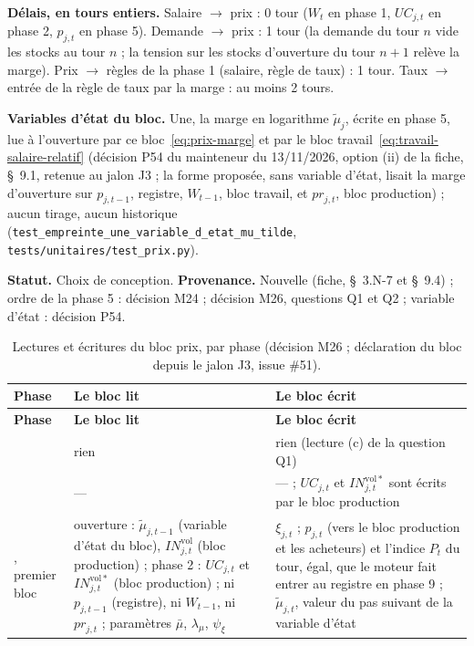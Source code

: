 \documentclass[11pt,a4paper]{article}
\begin{document}
\textbf{Délais, en tours entiers.} Salaire $\to$ prix : 0 tour ($W_t$ en phase 1, $\mathit{UC}_{j,t}$ en phase 2, $p_{j,t}$ en phase 5). Demande $\to$ prix : 1 tour (la demande du tour $n$ vide les stocks au tour $n$ ; la tension sur les stocks d'ouverture du tour $n + 1$ relève la marge). Prix $\to$ règles de la phase 1 (salaire, règle de taux) : 1 tour. Taux $\to$ entrée de la règle de taux par la marge : au moins 2 tours.

\textbf{Variables d'état du bloc.} Une, la marge en logarithme $\tilde\mu_{j}$, écrite en phase 5, lue à l'ouverture par ce bloc~\eqref{eq:prix-marge} et par le bloc travail~\eqref{eq:travail-salaire-relatif} (décision P54 du mainteneur du 13/11/2026, option (ii) de la fiche, \S~9.1, retenue au jalon J3 ; la forme proposée, sans variable d'état, lisait la marge d'ouverture sur $p_{j,t-1}$, registre, $W_{t-1}$, bloc travail, et $\mathit{pr}_{j,t}$, bloc production) ; aucun tirage, aucun historique (\nolinkurl{test_empreinte_une_variable_d_etat_mu_tilde}, \nolinkurl{tests/unitaires/test_prix.py}).

\textbf{Statut.} Choix de conception. \textbf{Provenance.} Nouvelle (fiche, \S~3.N-7 et \S~9.4) ; ordre de la phase 5 : décision M24 ; décision M26, questions Q1 et Q2 ; variable d'état : décision P54.

\begin{center}\small
\begin{longtable}{>{\raggedright\arraybackslash}p{1.6cm}>{\raggedright\arraybackslash}p{6.9cm}>{\raggedright\arraybackslash}p{6.4cm}}
\caption{Lectures et écritures du bloc prix, par phase (décision M26 ; déclaration du bloc depuis le jalon J3, issue \#51).}\label{tab:prix-phases}\\
\toprule
\textbf{Phase} & \textbf{Le bloc lit} & \textbf{Le bloc écrit}\\
\midrule
\endfirsthead
\toprule
\textbf{Phase} & \textbf{Le bloc lit} & \textbf{Le bloc écrit}\\
\midrule
\endhead
1 & rien & rien (lecture (c) de la question Q1)\\
2 & --- & --- ; $\mathit{UC}_{j,t}$ et $\mathit{IN}^{\mathrm{vol}\ast}_{j,t}$ sont écrits par le bloc production\\
5, premier bloc & ouverture : $\tilde\mu_{j,t-1}$ (variable d'état du bloc), $\mathit{IN}^{\mathrm{vol}}_{j,t}$ (bloc production) ; phase 2 : $\mathit{UC}_{j,t}$ et $\mathit{IN}^{\mathrm{vol}\ast}_{j,t}$ (bloc production) ; ni $p_{j,t-1}$ (registre), ni $W_{t-1}$, ni $\mathit{pr}_{j,t}$ ; paramètres $\bar\mu$, $\lambda_\mu$, $\psi_\xi$ & $\xi_{j,t}$ ; $p_{j,t}$ (vers le bloc production et les acheteurs) et l'indice $P_t$ du tour, égal, que le moteur fait entrer au registre en phase 9 ; $\tilde\mu_{j,t}$, valeur du pas suivant de la variable d'état\\
\bottomrule
\end{longtable}
\end{center}
\end{document}
